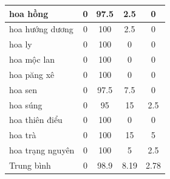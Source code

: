 \documentclass[12pt]{report}
\begin{document}
\begin{table}
\begin{tabular}{|l|c|c|c|c|}
			hoa hồng                      & 0          & 97.5      & 2.5                                                      & 0                                                         \\ \hline
			hoa hướng dương               & 0          & 100       & 2.5                                                      & 0                                                         \\ \hline
			hoa ly                        & 0          & 100       & 0                                                        & 0                                                         \\ \hline
			hoa mộc lan                   & 0          & 100       & 0                                                        & 0                                                         \\ \hline
			hoa păng xê                   & 0          & 100       & 0                                                        & 0                                                         \\ \hline
			hoa sen                       & 0          & 97.5      & 7.5                                                      & 0                                                         \\ \hline
			hoa súng                      & 0          & 95        & 15                                                       & 2.5                                                       \\ \hline
			hoa thiên điểu                & 0          & 100       & 0                                                        & 0                                                         \\ \hline
			hoa trà                       & 0          & 100       & 15                                                       & 5                                                         \\ \hline
			hoa trạng nguyên              & 0          & 100       & 5                                                        & 2.5                                                       \\ \hline
			Trung bình                    & 0          & 98.9      & 8.19                                                     & 2.78                                                      \\ \hline
			\end{tabular}
		\end{table}\newpage
\end{document}
